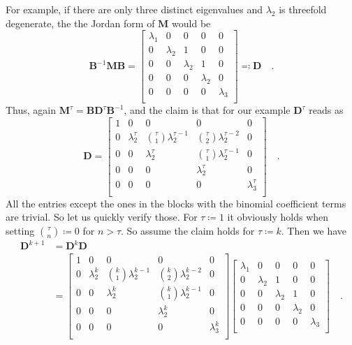 \documentclass[../../main.tex]{subfiles}
\begin{document}
    For example, if there are only three distinct eigenvalues and $\lambda_2$ is threefold degenerate, the the Jordan form of $\bm{M}$ would be
    \[
        \bm{B}^{-1}\bm{MB} =
        \begin{bmatrix}
        \lambda_1 & 0 & 0 & 0 & 0 \\
        0 & \lambda_2 & 1 & 0 & 0 \\
        0 & 0 & \lambda_2 & 1 & 0 \\
        0 & 0 & 0 & \lambda_2 & 0 \\
        0 & 0 & 0 & 0 & \lambda_3 \\
        \end{bmatrix}
        \eqqcolon \bm{D}
        \quad .
    \]
    Thus, again $\bm{M}^\tau = \bm{BD}^\tau \bm{B}^{-1}$, and the claim is that for our example $\bm{D}^\tau$ reads as
    \[
        \bm{D} =
        \begin{bmatrix}
        1 & 0 & 0 & 0 & 0 \\
        0 & \lambda_2^\tau & \binom{\tau}{1} \lambda_2^{\tau - 1} & \binom{\tau}{2} \lambda_2^{\tau - 2} & 0 \\
        0 & 0 & \lambda_2^\tau & \binom{\tau}{1} \lambda_2^{\tau - 1} & 0 \\
        0 & 0 & 0 & \lambda_2^\tau & 0 \\
        0 & 0 & 0 & 0 & \lambda_3^\tau \\
        \end{bmatrix}
        \quad .
    \]
    All the entries except the ones in the blocks with the binomial coefficient terms are trivial. So let us quickly verify those. For $\tau \coloneqq 1$ it obviously holds when setting $\binom{\tau}{n} \coloneqq 0$ for $n > \tau$. So assume the claim holds for $\tau \coloneqq k$. Then we have
    \begin{align*}
        \bm{D}^{k + 1} &= \bm{D}^k \bm{D} \\
        &=
        \begin{bmatrix}
        1 & 0 & 0 & 0 & 0 \\
        0 & \lambda_2^k & \binom{k}{1} \lambda_2^{k - 1} & \binom{k}{2} \lambda_2^{k - 2} & 0 \\
        0 & 0 & \lambda_2^k & \binom{k}{1} \lambda_2^{k - 1} & 0 \\
        0 & 0 & 0 & \lambda_2^k & 0 \\
        0 & 0 & 0 & 0 & \lambda_3^k \\
        \end{bmatrix}
        \begin{bmatrix}
        \lambda_1 & 0 & 0 & 0 & 0 \\
        0 & \lambda_2 & 1 & 0 & 0 \\
        0 & 0 & \lambda_2 & 1 & 0 \\
        0 & 0 & 0 & \lambda_2 & 0 \\
        0 & 0 & 0 & 0 & \lambda_3 \\
        \end{bmatrix}
        \quad . \\
    \end{align*}
\end{document}
